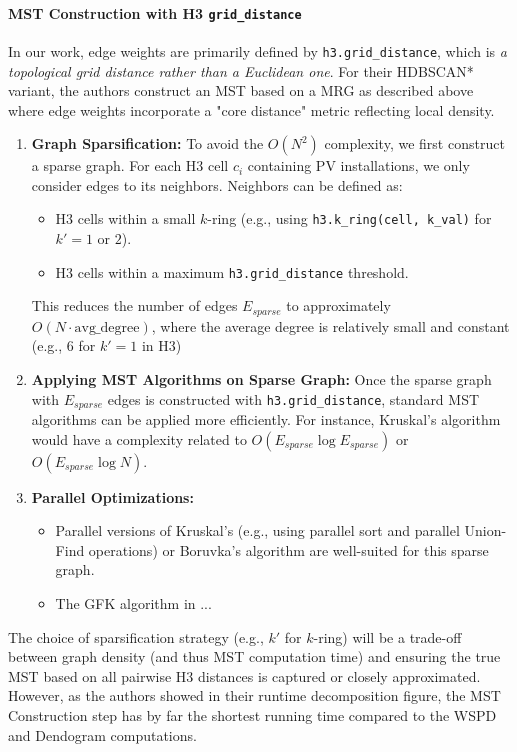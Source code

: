 \begin{multicols}{2}
\paragraph{MST Construction with H3 \texttt{grid\_distance}}
In our work, edge weights are primarily defined by \texttt{h3.grid\_distance}, which is \textit{a topological grid distance rather than a Euclidean one}. For their HDBSCAN* variant, the authors construct an MST based on a MRG as described above where edge weights incorporate a "core distance" metric reflecting local density. 
\begin{enumerate}
    \item \textbf{Graph Sparsification:} To avoid the $O(N^2)$ complexity, we first construct a sparse graph. For each H3 cell $c_i$ containing PV installations, we only consider edges to its neighbors. Neighbors can be defined as:
    \begin{itemize}
        \item H3 cells within a small $k$-ring (e.g., using \texttt{h3.k\_ring(cell, k\_val)} for $k' = 1 \text{ or } 2$).
        \item H3 cells within a maximum \texttt{h3.grid\_distance} threshold.
    \end{itemize}
    This reduces the number of edges $E_{sparse}$ to approximately $O(N \cdot \text{avg\_degree})$, where the average degree is relatively small and constant (e.g., 6 for $k'=1$ in H3)
    \item \textbf{Applying MST Algorithms on Sparse Graph:} Once the sparse graph with $E_{sparse}$ edges is constructed with \texttt{h3.grid\_distance}, standard MST algorithms can be applied more efficiently. For instance, Kruskal's algorithm would have a complexity related to $O(E_{sparse} \log E_{sparse})$ or $O(E_{sparse} \log N)$.
    \item \textbf{Parallel Optimizations:}
        \begin{itemize}
            \item Parallel versions of Kruskal's (e.g., using parallel sort and parallel Union-Find operations) or Boruvka's algorithm are well-suited for this sparse graph.
            \item The GFK algorithm in \cite{Wang_Yu_Gu_Shun_2021}...
        \end{itemize}
\end{enumerate}
The choice of sparsification strategy (e.g., $k'$ for $k$-ring) will be a trade-off between graph density (and thus MST computation time) and ensuring the true MST based on all pairwise H3 distances is captured or closely approximated. However, as the authors showed in their runtime decomposition figure, the MST Construction step has by far the shortest running time compared to the WSPD and Dendogram computations.


\end{multicols}
